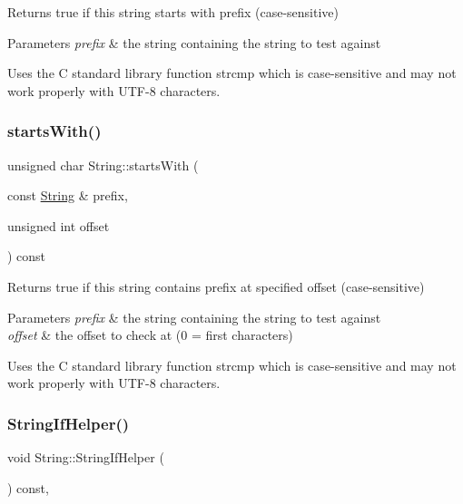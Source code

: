 Returns true if this string starts with prefix (case-\/sensitive) 


\begin{DoxyParams}{Parameters}
{\em prefix} & the string containing the string to test against\\
\hline
\end{DoxyParams}
Uses the C standard library function strcmp which is case-\/sensitive and may not work properly with U\+T\+F-\/8 characters. \mbox{\label{class_string_a2ea4d98b45263f59c9eb1f842b04b3af}} 
\subsubsection{\texorpdfstring{starts\+With()}{startsWith()}\hspace{0.1cm}{\footnotesize\ttfamily [2/2]}}
{\footnotesize\ttfamily unsigned char String\+::starts\+With (\begin{DoxyParamCaption}\item[{const \hyperlink{class_string}{String} \&}]{prefix,  }\item[{unsigned int}]{offset }\end{DoxyParamCaption}) const}



Returns true if this string contains prefix at specified offset (case-\/sensitive) 


\begin{DoxyParams}{Parameters}
{\em prefix} & the string containing the string to test against\\
\hline
{\em offset} & the offset to check at (0 = first characters)\\
\hline
\end{DoxyParams}
Uses the C standard library function strcmp which is case-\/sensitive and may not work properly with U\+T\+F-\/8 characters. \mbox{\label{class_string_a7587eade7e0df22dca2c424df32198de}} 
\subsubsection{\texorpdfstring{String\+If\+Helper()}{StringIfHelper()}}
{\footnotesize\ttfamily void String\+::\+String\+If\+Helper (\begin{DoxyParamCaption}{ }\end{DoxyParamCaption}) const\hspace{0.3cm}{\ttfamily [inline]}, {\ttfamily [private]}}



